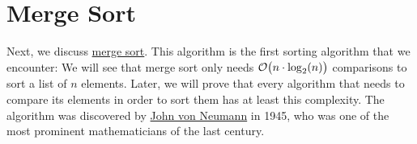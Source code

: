 
\section{Merge Sort}
Next, we discuss \href{https://en.wikipedia.org/wiki/Merge_sort}{merge sort}.  This algorithm
is the first  sorting algorithm that we encounter: We will see that merge sort 
only needs $\mathcal{O}\bigl(n \cdot \log_2(n)\bigr)$ comparisons to sort a list of $n$ elements.  Later, we will prove
that every algorithm that needs to compare its elements in order to sort them has at least this complexity.  
The  algorithm was discovered by
\href{http://en.wikipedia.org/wiki/John_von_Neumann}{John von Neumann} in 1945, who 
was one of the most prominent mathematicians of the last century.  


